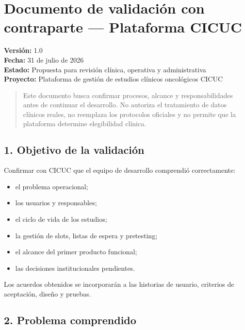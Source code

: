 \documentclass[
]{article}
\author{}
\date{}
\providecommand{\tightlist}{%
  \setlength{\itemsep}{0pt}\setlength{\parskip}{0pt}}
\begin{document}
\hypertarget{documento-de-validaciuxf3n-con-contraparte--plataforma-cicuc}{%
\section{Documento de validación con contraparte --- Plataforma
CICUC}\label{documento-de-validaciuxf3n-con-contraparte--plataforma-cicuc}}

\textbf{Versión:} 1.0\\
\textbf{Fecha:} 31 de julio de 2026\\
\textbf{Estado:} Propuesta para revisión clínica, operativa y
administrativa\\
\textbf{Proyecto:} Plataforma de gestión de estudios clínicos
oncológicos CICUC

\begin{quote}
Este documento busca confirmar procesos, alcance y responsabilidades
antes de continuar el desarrollo. No autoriza el tratamiento de datos
clínicos reales, no reemplaza los protocolos oficiales y no permite que
la plataforma determine elegibilidad clínica.
\end{quote}

\hypertarget{1-objetivo-de-la-validaciuxf3n}{%
\subsection{1. Objetivo de la
validación}\label{1-objetivo-de-la-validaciuxf3n}}

Confirmar con CICUC que el equipo de desarrollo comprendió
correctamente:

\begin{itemize}
\tightlist
\item
  el problema operacional;
\item
  los usuarios y responsables;
\item
  el ciclo de vida de los estudios;
\item
  la gestión de slots, listas de espera y pretesting;
\item
  el alcance del primer producto funcional;
\item
  las decisiones institucionales pendientes.
\end{itemize}

Los acuerdos obtenidos se incorporarán a las historias de usuario,
criterios de aceptación, diseño y pruebas.

\hypertarget{2-problema-comprendido}{%
\subsection{2. Problema comprendido}\label{2-problema-comprendido}}
\end{document}
